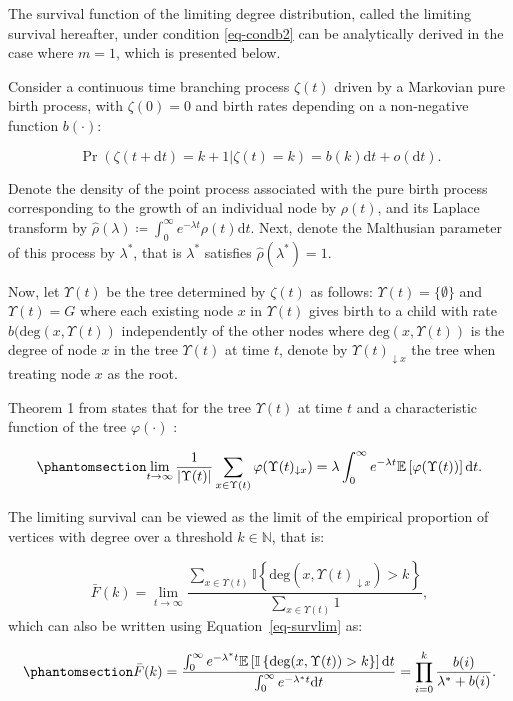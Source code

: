\documentclass[
  sn-basic,
]{sn-jnl}
\theoremstyle{plain}
\theoremstyle{plain}
\theoremstyle{remark}
\begin{document}
The survival function of the limiting degree distribution, called the
limiting survival hereafter, under condition \ref{eq-condb2} can be
analytically derived in the case where \(m=1\), which is presented
below.

Consider a continuous time branching process \(\zeta(t)\) driven by a
Markovian pure birth process, with \(\zeta(0)=0\) and birth rates
depending on a non-negative function \(b(\cdot)\):

\[
\Pr(\zeta(t+\text{d}t)=k+1|\zeta(t)=k) = b(k)\text{d}t + o(\text{d}t).
\]

Denote the density of the point process associated with the pure birth
process corresponding to the growth of an individual node by
\(\rho(t)\), and its Laplace transform by
\(\hat \rho(\lambda)\coloneq \int_0^\infty e^{-\lambda t}\rho(t)\text{d}t\).
Next, denote the Malthusian parameter of this process by \(\lambda^*\),
that is \(\lambda^*\) satisfies \(\hat\rho(\lambda^*) = 1\).

Now, let \(\Upsilon(t)\) be the tree determined by \(\zeta(t)\) as
follows: \(\Upsilon(t)=\{\emptyset\}\) and \(\Upsilon(t)=G\) where each
existing node \(x\) in \(\Upsilon(t)\) gives birth to a child with rate
\(b(\mathrm{deg}(x, \Upsilon(t))\) independently of the other nodes
where \(\mathrm{deg}(x, \Upsilon(t))\) is the degree of node \(x\) in
the tree \(\Upsilon(t)\) at time \(t\), denote by
\(\Upsilon(t)_{\downarrow x}\) the tree when treating node \(x\) as the
root.

Theorem 1 from \citet{rudas07} states that for the tree \(\Upsilon(t)\)
at time \(t\) and a characteristic function of the tree
\(\varphi(\cdot)\) :

\begin{equation}\phantomsection\label{eq-survlim}{
\lim_{t\rightarrow\infty}\frac{1}{|\Upsilon(t)|}\sum_{x\in\Upsilon(t)}\varphi(\Upsilon(t)_{\downarrow x}) = \lambda \int_0^\infty e^{-\lambda t}\mathbb E\left[\varphi(\Upsilon(t))\right]\text{d}t.
}\end{equation}

The limiting survival can be viewed as the limit of the empirical
proportion of vertices with degree over a threshold \(k\in\mathbb N\),
that is:

\[
\bar F(k) = \lim_{t\rightarrow\infty}\frac{\sum_{x\in\Upsilon(t)}\mathbb I\left\{\text{deg}(x,\Upsilon(t)_{\downarrow x})>k\right\}}{\sum_{x\in\Upsilon(t)} 1},
\] which can also be written using Equation~\ref{eq-survlim} as:

\begin{equation}\phantomsection\label{eq-surv-origin}{
\bar F(k) = \frac{\int_0^\infty e^{-\lambda^* t}\mathbb E\left[\mathbb I\left\{\text{deg}(x,\Upsilon(t))>k\right\}\right]\text{d}t}{\int_0^\infty e^{-\lambda^* t}\text{d}t} = \prod_{i=0}^k\frac{b(i)}{\lambda^* + b(i)}.
}\end{equation}
\end{document}
